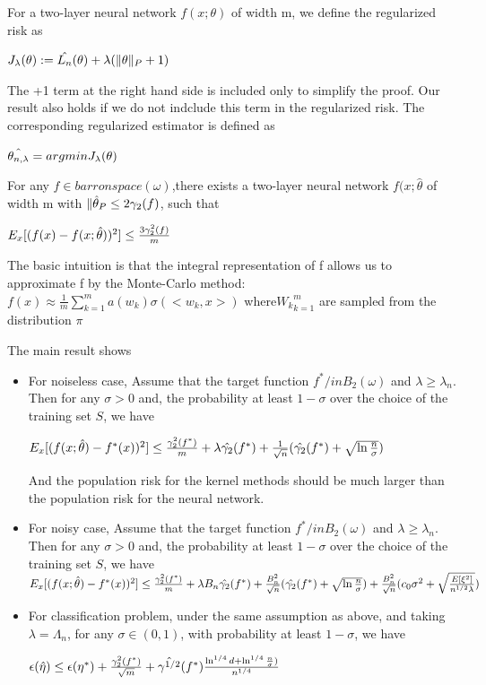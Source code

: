 \documentclass{article}
\begin{document}
For a two-layer neural network $f(x;\theta)$ of width m, we define the regularized risk as 
\begin{center}
  ${\MakeUppercase{J}_\lambda}(\theta) : = \hat{\MakeUppercase{L}_n}(\theta)+ \lambda(\|\theta\|_P+1)$
\end{center}
The +1 term at the right hand side is included only to simplify the proof. Our result also holds if we do not indclude this term in  the regularized risk. The corresponding regularized estimator is defined as 
\begin{center}
  $\hat{\theta_{n,\lambda}} = argmin{{\MakeUppercase{J}_\lambda}(\theta)}$
\end{center}

For any $f \in barron space(\omega)$,there exists a two-layer neural network $f(x;\hat{\theta}$ of width m with $\|\Hat{\theta}_P\leq 2\gamma_2(f)$, such that
\begin{center}
  $E_x[(f(x)-f(x;\Hat{\theta}))^2]\leq\frac{3\gamma_2^2(f)}{m}$
\end{center}
The basic intuition is that the integral representation of f allows us to approximate f by the Monte-Carlo method:$f(x) \approx\frac{1}{m}\sum_{k=1}^{m} a(w_k){\sigma(<w_k,x>)}$ where${W_k}_{k=1}^m$ are sampled from the distribution $\pi$

The main result shows 
\begin{itemize}
\item For noiseless case, Assume that the target function $f^* /in B_2(\omega)$ and $\lambda \geq \lambda_n$. Then for any $\sigma > 0 $ and, the probability at least $1-\sigma$ over the choice of the training set $S$, we have
    \begin{center}
      $E_x[(f(x;\Hat{\theta})-f^*(x))^2]\leq\frac{\gamma_2^2(f^*)}{m} +\lambda \Hat{\gamma_2}(f^*)+\frac{1}{\sqrt{n}}(\Hat{\gamma_2}(f^*)+\sqrt{\ln{\frac{n}{\sigma}}})$
    \end{center}
And the population risk for the kernel methods should be much larger than the population risk for the neural network.
\item For noisy case, Assume that the target function $f^* /in B_2(\omega)$ and $\lambda \geq \lambda_n$. Then for any $\sigma > 0 $ and, the probability at least $1-\sigma$ over the choice of the training set $S$, we have
      $E_x[(f(x;\Hat{\theta})-f^*(x))^2]\leq\frac{\gamma_2^2(f^*)}{m} +\lambda B_n \Hat{\gamma_2}(f^*)+\frac{B^2_n}{\sqrt{n}}(\Hat{\gamma_2}(f^*)+\sqrt{\ln{\frac{n}{\sigma}}})+\frac{B^2_n}{\sqrt{n}}(c_0 \sigma^2+\sqrt{\frac{E[\xi^2]}{n^{1/2}\lambda}})$
\item For classification problem, under the same assumption as above, and taking $\lambda = \Lambda_n$, for any $\sigma \in (0,1)$, with probability at least $1-\sigma$, we have
    \begin{center}
      $\epsilon(\Hat{\eta}) \leq \epsilon(\eta ^*) + \frac{\gamma_2^2(f^*)}{\sqrt{m}}+\Hat{\gamma^{1/2}}(f^*)\frac{\ln^{1/4}{d}+\ln^{1/4}{\frac{n}{\sigma}})}{n^{1/4}}$
    \end{center}
\end{itemize}
\end{document}

